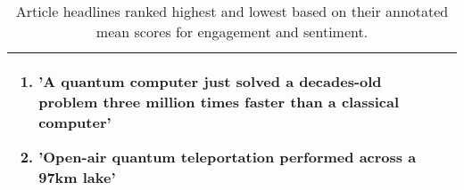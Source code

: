 \begin{table}
\begin{adjustbox}{center}
\begin{tabular}{p{0.5cm} p{7cm} p{7cm}}
{\begin{enumerate}
        \item 'A quantum computer just solved a decades-old problem three million times faster than a classical computer'
        \item 'Open-air quantum teleportation performed across a 97km lake'
        \end{enumerate}}
    \\
    \bottomrule
\end{tabular}
    \end{adjustbox}
    \vspace{1em}
    \caption{Article headlines ranked highest and lowest based on their annotated mean scores for engagement and sentiment.}

    \label{tab:top_score_headlines}
\end{table}

\renewcommand{\arraystretch}{1.4}

